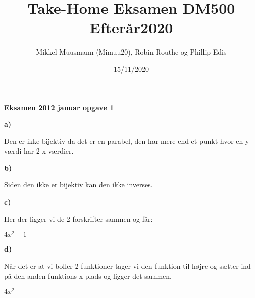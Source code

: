 \documentclass{article}
\title{\textbf{Take-Home Eksamen DM500 Efterår2020}}
\author{Mikkel Muusmann (Mimuu20), Robin Routhe og Phillip Edis}
\date{15/11/2020}
\begin{document}
\maketitle

\textbf{Eksamen 2012 januar opgave 1}

\textbf{a)}

Den er ikke bijektiv da det er en parabel, den har mere end et punkt
hvor en y værdi har 2 x værdier. 

\textbf{b)}

Siden den ikke er bijektiv kan den ikke inverses.

\textbf{c)}
\begin{center}
Her der ligger vi de 2 forskrifter sammen og får:
\end{center}
$4x^2-1$

\textbf{d)}

Når det er at vi boller 2 funktioner tager vi den funktion til højre og sætter ind på den anden funktions x plads og ligger det sammen.

$4x^2$
\end{document}
